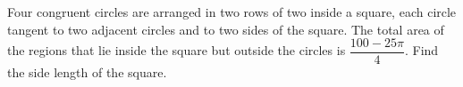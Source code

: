Four congruent circles are arranged in two rows of two inside a square, each circle tangent to two adjacent circles and to two sides of the square. The total area of the regions that lie inside the square but outside the circles is $\dfrac{100-25\pi}{4}$. Find the side length of the square.
